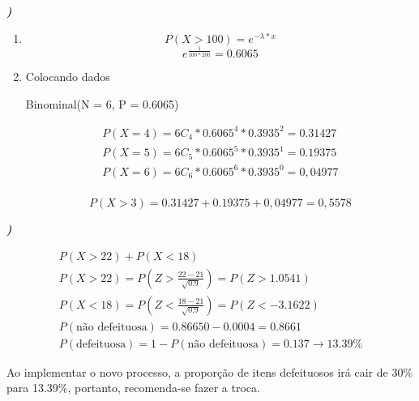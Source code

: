 \documentclass[12pt]{article}
\newcounter{instn}
\newcommand{\instnum}{\arabic{instn}}
\newcommand{\myline}[1]{
    \emph{\textbf{#1)}}
    \addtocounter{instn}{1}
}
\newenvironment{question}
 {
    \myline{\instnum} 
    }
    {
 }
\begin{document}
    \begin{question}
        \begin{enumerate}[label={\textbf{\alph*)}}]
            \item
            \[
                P(X>100) = e^{-\lambda * x}   
            \]
            \begin{equation}
                e^{\frac{1}{100*200}} = 0.6065
            \end{equation}
            \item Colocando dados 
            \begin{center}
                Binominal(N = 6, P = 0.6065) \\ 
            \end{center}

            \begin{align*}
                P(X=4) =6C_4*0.6065^{4}*0.3935^{2}=0.31427 \\
                P(X=5) =6C_5*0.6065^{5}*0.3935^{1}=0.19375 \\
                P(X=6) =6C_6*0.6065^{6}*0.3935^{0}=0,04977 \\
            \end{align*}

            \begin{equation}
                P(X>3) = 0.31427 + 0.19375 + 0,04977 = 0,5578
            \end{equation}

        \end{enumerate}
    \end{question}


    \begin{question}
        \begin{align*}
            P(X > 22) + P(X < 18) \\ 
            P(X > 22) = P(Z > \frac{22 - 21}{\sqrt{0.9}}) = P(Z > 1.0541) \\ 
            P(X < 18) = P(Z < \frac{18-21}{\sqrt{0.9}}) = P(Z < -3.1622) \\ 
            P(\text{não defeituosa}) = 0.86650 - 0.0004 = 0.8661 \\ 
            P(\text{defeituosa}) = 1 - P(\text{não defeituosa}) = 0.137 \rightarrow 13.39\%
        \end{align*}

        Ao implementar o novo processo, a proporção de itens defeituosos irá cair de 30\% 
        para 13.39\%, portanto, recomenda-se fazer a troca.
    \end{question}
\end{document}
